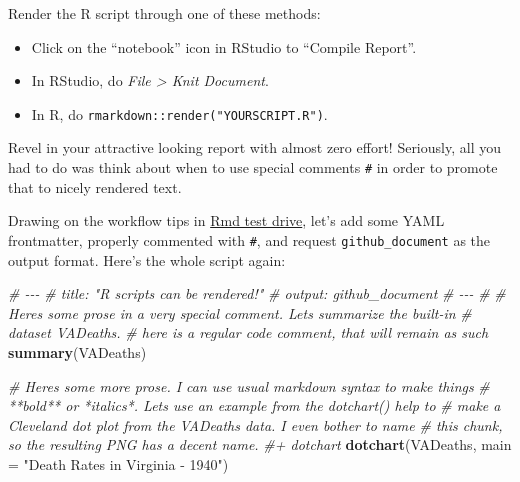 \documentclass[
]{book}
\newenvironment{Shaded}{\begin{snugshade}}{\end{snugshade}}
\newcommand{\AttributeTok}[1]{\textcolor[rgb]{0.13,0.29,0.53}{#1}}
\newcommand{\CommentTok}[1]{\textcolor[rgb]{0.56,0.35,0.01}{\textit{#1}}}
\newcommand{\FunctionTok}[1]{\textcolor[rgb]{0.13,0.29,0.53}{\textbf{#1}}}
\newcommand{\NormalTok}[1]{#1}
\newcommand{\StringTok}[1]{\textcolor[rgb]{0.31,0.60,0.02}{#1}}
\providecommand{\tightlist}{%
  \setlength{\itemsep}{0pt}\setlength{\parskip}{0pt}}
\begin{document}
Render the R script through one of these methods:

\begin{itemize}
\tightlist
\item
  Click on the ``notebook'' icon in RStudio to ``Compile Report''.
\item
  In RStudio, do \emph{File \textgreater{} Knit Document}.
\item
  In R, do \texttt{rmarkdown::render("YOURSCRIPT.R")}.
\end{itemize}

Revel in your attractive looking report with almost zero effort!
Seriously, all you had to do was think about when to use special comments \texttt{\#\textquotesingle{}} in order to promote that to nicely rendered text.

Drawing on the workflow tips in \hyperref[rmd-test-drive]{Rmd test drive}, let's add some YAML frontmatter, properly commented with \texttt{\#\textquotesingle{}}, and request \texttt{github\_document} as the output format.
Here's the whole script again:

\begin{Shaded}
\begin{Highlighting}[]
\CommentTok{\#\textquotesingle{} {-}{-}{-}}
\CommentTok{\#\textquotesingle{} title: "R scripts can be rendered!"}
\CommentTok{\#\textquotesingle{} output: github\_document}
\CommentTok{\#\textquotesingle{} {-}{-}{-}}
\CommentTok{\#\textquotesingle{}}
\CommentTok{\#\textquotesingle{} Here\textquotesingle{}s some prose in a very special comment. Let\textquotesingle{}s summarize the built{-}in}
\CommentTok{\#\textquotesingle{} dataset \textasciigrave{}VADeaths\textasciigrave{}.}
\CommentTok{\# here is a regular code comment, that will remain as such}
\FunctionTok{summary}\NormalTok{(VADeaths)}

\CommentTok{\#\textquotesingle{} Here\textquotesingle{}s some more prose. I can use usual markdown syntax to make things}
\CommentTok{\#\textquotesingle{} **bold** or *italics*. Let\textquotesingle{}s use an example from the \textasciigrave{}dotchart()\textasciigrave{} help to}
\CommentTok{\#\textquotesingle{} make a Cleveland dot plot from the \textasciigrave{}VADeaths\textasciigrave{} data. I even bother to name}
\CommentTok{\#\textquotesingle{} this chunk, so the resulting PNG has a decent name.}
\CommentTok{\#+ dotchart}
\FunctionTok{dotchart}\NormalTok{(VADeaths, }\AttributeTok{main =} \StringTok{"Death Rates in Virginia {-} 1940"}\NormalTok{)}
\end{Highlighting}
\end{Shaded}
\end{document}
